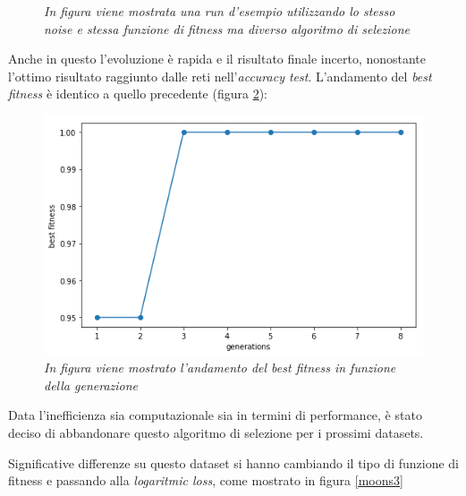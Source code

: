 \documentclass[12pt,a4paper]{report}
\begin{document}
\begin{figure}[H]
 \caption{\textit{In figura viene mostrata una run d'esempio utilizzando lo stesso noise e stessa funzione di fitness ma diverso algoritmo di selezione}}
 \label{moons2}
\end{figure}

Anche in questo l'evoluzione è rapida e il risultato finale incerto, nonostante l'ottimo risultato raggiunto dalle reti nell'\textit{accuracy test}. L'andamento del \textit{best fitness} è identico a quello precedente (figura \ref{best2}):

\begin{figure}[H]
 \centering
 \includegraphics[scale = 0.5]{images/moons-sons-acc./best}
 \caption{\textit{In figura viene mostrato l'andamento del best fitness in funzione della generazione}}
 \label{best2}
\end{figure}

Data l'inefficienza sia computazionale sia in termini di performance, è stato deciso di abbandonare questo algoritmo di selezione per i prossimi datasets.


Significative differenze su questo dataset si hanno cambiando il tipo di funzione di fitness e passando alla \textit{logaritmic loss}, come mostrato in figura \ref{moons3}
\end{document}
